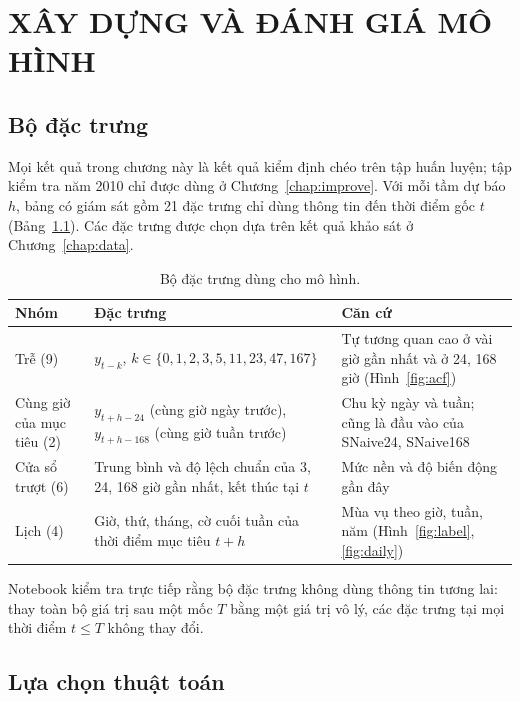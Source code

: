 \chapter{XÂY DỰNG VÀ ĐÁNH GIÁ MÔ HÌNH}
\label{chap:models}

\section{Bộ đặc trưng}
\label{sec:features}

Mọi kết quả trong chương này là kết quả kiểm định chéo trên tập huấn luyện; tập kiểm tra năm 2010 chỉ được dùng ở Chương~\ref{chap:improve}. Với mỗi tầm dự báo $h$, bảng có giám sát gồm 21 đặc trưng chỉ dùng thông tin đến thời điểm gốc $t$ (Bảng~\ref{tab:features}). Các đặc trưng được chọn dựa trên kết quả khảo sát ở Chương~\ref{chap:data}.

\begin{table}[htbp]
    \centering
    \caption{Bộ đặc trưng dùng cho mô hình.}
    \label{tab:features}
    \small
    \begin{tabularx}{\textwidth}{|>{\raggedright\arraybackslash}p{2.6cm}|>{\raggedright\arraybackslash}p{5.6cm}|>{\raggedright\arraybackslash}X|}
        \hline
        \textbf{Nhóm} & \textbf{Đặc trưng} & \textbf{Căn cứ} \\ \hline
        Trễ (9) & $y_{t-k}$, $k \in \{0,1,2,3,5,11,23,47,167\}$ & Tự tương quan cao ở vài giờ gần nhất và ở 24, 168 giờ (Hình~\ref{fig:acf}) \\ \hline
        Cùng giờ của mục tiêu (2) & $y_{t+h-24}$ (cùng giờ ngày trước), $y_{t+h-168}$ (cùng giờ tuần trước) & Chu kỳ ngày và tuần; cũng là đầu vào của SNaive24, SNaive168 \\ \hline
        Cửa sổ trượt (6) & Trung bình và độ lệch chuẩn của 3, 24, 168 giờ gần nhất, kết thúc tại $t$ & Mức nền và độ biến động gần đây \\ \hline
        Lịch (4) & Giờ, thứ, tháng, cờ cuối tuần của thời điểm mục tiêu $t+h$ & Mùa vụ theo giờ, tuần, năm (Hình~\ref{fig:label}, \ref{fig:daily}) \\ \hline
    \end{tabularx}
\end{table}

Notebook kiểm tra trực tiếp rằng bộ đặc trưng không dùng thông tin tương lai: thay toàn bộ giá trị sau một mốc $T$ bằng một giá trị vô lý, các đặc trưng tại mọi thời điểm $t \le T$ không thay đổi.

\section{Lựa chọn thuật toán}
\label{sec:algorithms}


